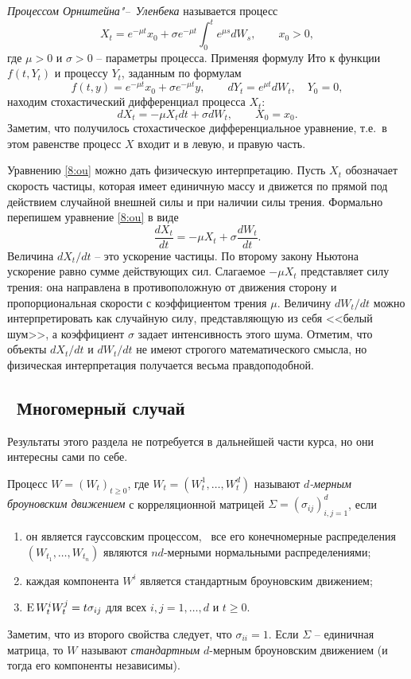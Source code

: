 \begin{example}
\emph{Процессом Орнштейна"--~Уленбека} называется процесс
\[
X_t = e^{-\mu t}x_0 + \sigma e^{-\mu t}\int_0^t e^{\mu s} dW_s, \qquad x_0>0,
\]
где $\mu>0$ и $\sigma>0$ -- параметры процесса.
Применяя формулу Ито к функции $f(t,Y_t)$ и процессу $Y_t$, заданным по формулам
\[
f(t,y) = e^{-\mu t}x_0 + \sigma e^{-\mu t} y, \qquad
dY_t = e^{\mu t} dW_t, \quad Y_0=0,
\]
находим стохастический дифференциал процесса $X_t$:
\begin{equation}
\label{8:ou}
dX_t = -\mu X_t dt + \sigma dW_t, \qquad X_0=x_0.
\end{equation}
Заметим, что получилось стохастическое дифференциальное уравнение, т.е.\ в этом равенстве процесс $X$ входит и в левую, и правую часть.

Уравнению \eqref{8:ou} можно дать физическую интерпретацию.
Пусть $X_t$ обозначает скорость частицы, которая имеет единичную массу и движется по прямой под действием случайной внешней силы и при наличии силы трения.
Формально перепишем уравнение \eqref{8:ou} в виде
\[
\frac{dX_t}{dt} = -\mu X_t + \sigma \frac{dW_t}{dt}.
\]
Величина $d X_t/dt$ -- это ускорение частицы.
По второму закону Ньютона ускорение равно сумме действующих сил.
Слагаемое $-\mu X_t$ представляет силу трения: она направлена в противоположную от движения сторону и пропорциональная скорости с коэффициентом трения $\mu$.
Величину $dW_t/dt$ можно интерпретировать как случайную силу, представляющую из себя <<белый шум>>, а коэффициент $\sigma$ задает интенсивность этого шума.
Отметим, что объекты $dX_t/dt$ и $dW_t/dt$ не имеют строгого математического смысла, но физическая интерпретация получается весьма правдоподобной.
\end{example}


\subsection{\difficult\ Многомерный случай}

Результаты этого раздела не потребуется в дальнейшей части курса, но они интересны сами по себе.

\begin{definition}
Процесс $W=(W_t)_{t\ge 0}$, где $W_t=(W_t^1,\dots,W_t^d)$ называют \emph{$d$-мерным броуновским движением} с корреляционной матрицей $\Sigma = (\sigma_{ij})_{i,j=1}^d$, если
\begin{enumerate}
\item он является гауссовским процессом, \te\ все его конечномерные распределения $(W_{t_1},\dots, W_{t_n})$ являются $nd$-мерными нормальными распределениями;
\item каждая компонента $W^i$ является стандартным броуновским движением;
\item $\operatorname{E} W_t^iW_t^j = t\sigma_{ij}$ для всех $i,j=1,\dots,d$ и $t\ge0$.
\end{enumerate}

Заметим, что из второго свойства следует, что $\sigma_{ii}=1$.
Если $\Sigma$ -- единичная матрица, то $W$ называют \emph{стандартным} $d$-мерным броуновским движением (и тогда его компоненты независимы).
\end{definition}

